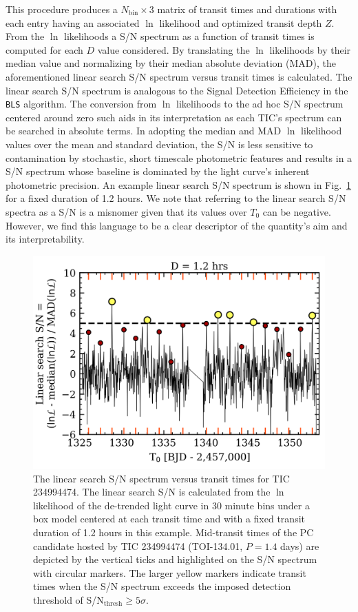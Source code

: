 This procedure produces a $N_{\text{bin}} \times 3$ matrix of transit times and durations
with each entry having an associated $\ln$ likelihood and optimized transit depth $Z$.
From the $\ln$ likelihoods a S/N spectrum as a function of transit times
is computed for each $D$ value considered. By translating the $\ln$ likelihoods by
their median value and normalizing by their median absolute deviation (MAD),
the aforementioned linear search S/N spectrum versus transit times is calculated.
The linear search S/N spectrum is analogous to the Signal Detection Efficiency in the
\texttt{BLS} algorithm. The conversion from
$\ln$ likelihoods to the ad hoc S/N spectrum centered around zero such aids in its interpretation as
each TIC's spectrum can be searched in absolute terms.
In adopting the median and MAD $\ln$ likelihood values over the mean and standard deviation, the S/N
is less sensitive to contamination by stochastic, short timescale photometric features
and results in a S/N spectrum whose baseline  is dominated by the light curve's
inherent photometric precision. An example linear search S/N spectrum is shown in
Fig.~\ref{fig:linearsearch} for a fixed duration of 1.2 hours. We note that referring to the
linear search S/N spectra as a S/N is a misnomer given that its values over $T_0$ can be negative.
However, we find this language to be a clear descriptor of the quantity's aim and its
interpretability. \\

\begin{figure}
  \centering
  \includegraphics[width=0.8\hsize]{figures/linearsearch_234994474.png}
  \caption[Results of the linear search for repeating transit-like events around TIC 234994474.]
      {The linear search S/N spectrum versus transit times for TIC 234994474.
    The linear search S/N is calculated from the $\ln$ likelihood of the de-trended light
    curve in 30 minute bins under a box model centered at each transit time and with a fixed
    transit duration of 1.2 hours in this example. Mid-transit times of the PC candidate
    hosted by TIC 234994474 (TOI-134.01, $P=1.4$ days) are depicted by the vertical ticks
    and highlighted on the S/N spectrum with circular markers. The larger yellow markers
    indicate transit times when the S/N spectrum exceeds the imposed \pipeline{}
    detection threshold of S/N$_{\text{thresh}}\geq 5\sigma$.}
  \label{fig:linearsearch}
\end{figure}

